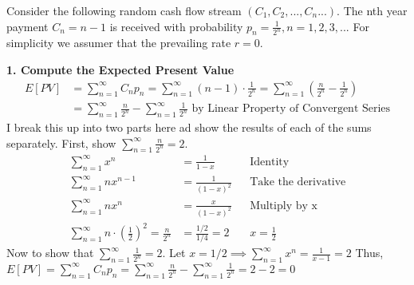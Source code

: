 \documentclass[12pt]{article}
\newenvironment{problem}[3][Problem]{\begin{trivlist}
\item[\hskip \labelsep {\bfseries #1}\hskip \labelsep {\bfseries #2.}]}{\end{trivlist}}
\newcommand{\infsum}{\sum_{n=1}^{\infty }}
\begin{document}
 
\newpage
\begin{problem}{3 (20 points)}x   Consider the following random cash flow stream $(C_1,C_2, ...,C_n...)$. The nth year payment $C_n = n-1$ is received 
with probability $p_n = \frac{1}{2^n}, n = 1,2,3,...$ For simplicity we assumer that the prevailing rate $r=0$. 

\textbf{1. Compute the Expected Present Value}
\begin{align*}
E[PV] &= \sum_{n=1}^{\infty } C_np_n= \infsum (n-1)\cdot \frac{1}{2^n} = \infsum (\frac{n}{2^n} - \frac{1}{2^n})  \\
&= \infsum \frac{n}{2^n} - \infsum \frac{1}{2^n} \text{ by Linear Property of Convergent Series} %
\end{align*} 
I break this up into two parts here ad show the results of each of the sums separately. First, show $ \sum_{n=1}^{\infty }\frac{n}{2^n} = 2 $. 
\begin{align} 
\infsum  x^n &= \frac{1}{1-x} && \text{Identity} \\ %
 \infsum nx^{n-1} &= \frac{1}{(1-x)^2} && \text{Take the derivative}\\
 \infsum nx^{n} &= \frac{x}{(1-x)^2} && \text{Multiply by x} \\
 \infsum n\cdot (\frac{1}{2})^2 = \frac{n}{2^n} &= \frac{1/2}{1/4}=2 && x=\frac{1}{2}
\end{align}
Now to show that $\infsum \frac{1}{2^n} = 2$. Let $x=1/2 \implies \infsum x^n = \frac{1}{x-1} = 2$ 
Thus, $ E[PV] = \infsum C_np_n = \infsum \frac{n}{2^n} - \infsum \frac{1}{2^n} = 2-2= 0$


\end{problem}
\end{document}

